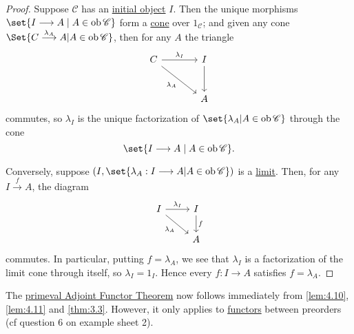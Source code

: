 \documentclass{article}
\DeclareMathOperator{\ob}{ob}
\let\to\longrightarrow
\begin{document}
\begin{proof}
  Suppose $\mathscr{C}$ has an \hyperlink{def:initial}{initial object} $I$.
  Then the unique morphisms
  $\set{I \to A \mid A \in \ob \mathscr{C}}$
  form a \hyperlink{def:cone}{cone} over $1_\mathscr{C}$; and given any cone $\Set{C \overset{\lambda_A}\to A | A \in \ob \mathscr{C}}$, then for any $A$ the triangle
  \begin{equation*}
    \begin{tikzcd}[sep=large]
      C \rar{\lambda_I} \drar[']{\lambda_A} & I \dar \\& A
    \end{tikzcd}
  \end{equation*}
  commutes, so $\lambda_I$ is the unique factorization of $\set{\lambda_A | A \in \ob \mathscr{C}}$ through the cone \begin{equation*}\set{I \to A \mid A \in \ob \mathscr{C}}.\end{equation*}

  Conversely, suppose $(I, \set{\lambda_A: I \to A| A \in \ob \mathscr{C}})$ is a \hyperlink{def:limit}{limit}.
  Then, for any $I \overset{f}\to A$, the diagram
  \begin{equation*}
    \begin{tikzcd}
      I \rar{\lambda_I} \drar[']{\lambda_A} & I \dar{f} \\ & A
    \end{tikzcd}
  \end{equation*}
  commutes.
  In particular, putting $f = \lambda_A$, we see that $\lambda_I$ is a factorization of the limit cone through itself, so $\lambda_I = 1_I$.
  Hence every $f: I \to A$ satisfies $f = \lambda_A$.
\end{proof}

The \hyperlink{thm:paft}{primeval Adjoint Functor Theorem} now follows immediately from \cref{lem:4.10}, \cref{lem:4.11} and \cref{thm:3.3}.
However, it only applies to \hyperlink{def:funct}{functors} between preorders (cf question 6 on example sheet 2).
\end{document}
